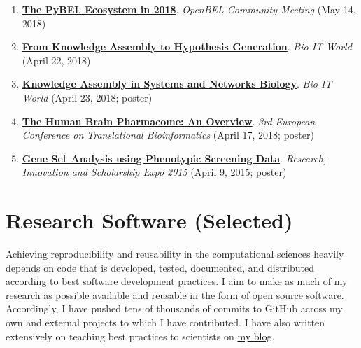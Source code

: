 \documentclass[10pt,a4paper,sans]{moderncv} %
\begin{document}
\begin{enumerate}
    \item \textbf{\href{https://docs.google.com/presentation/d/1Gsk8LxrVgrICproSgWZ3Gk4BXyOg-UwFlfzhVw5O0t8/edit?usp=sharing}{The PyBEL Ecosystem in 2018}}. \textit{OpenBEL Community Meeting} (May 14, 2018)

    \item \textbf{\href{https://docs.google.com/presentation/d/1_3j8H4f9pQ1m2ZQrF2QNfQNLh5SGqaodnl4AlaAST6w/edit?usp=sharing}{From Knowledge Assembly to Hypothesis Generation}}. \textit{Bio-IT World} (April 22, 2018)

    \item \textbf{\href{https://doi.org/10.6084/m9.figshare.6231701.v1}{Knowledge Assembly in Systems and Networks Biology}}. \textit{Bio-IT World} (April 23, 2018; poster)

    \item \textbf{\href{https://doi.org/10.6084/m9.figshare.6163775.v3}{The Human Brain Pharmacome: An Overview}}. \textit{3rd European Conference on Translational Bioinformatics} (April 17, 2018; poster)

    \item \textbf{\href{https://docs.google.com/presentation/d/1FU8lWGw6x4y9A_qB9rmxSaRRKiC0V3403EJETVGYMzk/edit?usp=sharing}{Gene Set Analysis using Phenotypic Screening Data}}. \textit{Research, Innovation and Scholarship Expo 2015} (April 9, 2015; poster)

\end{enumerate}

    \section{Research Software (Selected)}\label{sec:software}

    Achieving reproducibility and reusability in the computational
    sciences heavily depends on code that is developed,
    tested, documented, and distributed according to best software
    development practices. I aim to make as much of my research
    as possible available and reusable in the form of open source
    software. Accordingly, I have pushed tens of thousands of commits
    to GitHub across my own and external projects to which I have
    contributed. I have also written extensively on teaching best
    practices to scientists on \href{https://cthoyt.com/software/}{my blog}.

    \vspace{0.3cm}
\end{document}

